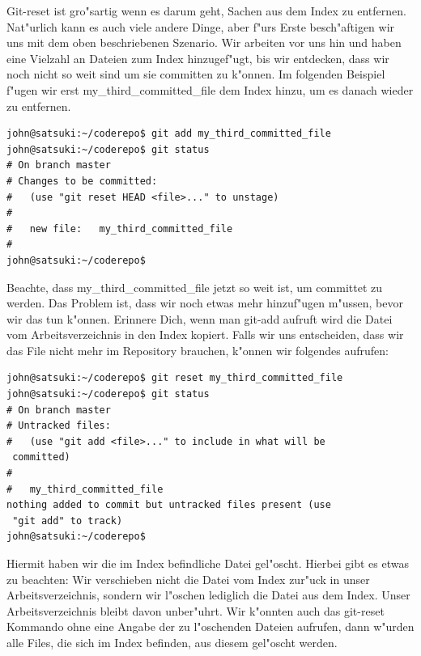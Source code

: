 Git-reset ist gro"sartig wenn es darum geht, Sachen aus dem Index zu entfernen. Nat"urlich kann es auch viele andere Dinge, aber f"urs Erste besch"aftigen wir uns mit dem oben beschriebenen Szenario. Wir arbeiten vor uns hin und haben eine Vielzahl an Dateien zum Index hinzugef"ugt, bis wir entdecken, dass wir noch nicht so weit sind um sie committen zu k"onnen. Im folgenden Beispiel f"ugen wir erst my\_third\_committed\_file dem Index hinzu, um es danach wieder zu entfernen.

\begin{Verbatim}
john@satsuki:~/coderepo$ git add my_third_committed_file
john@satsuki:~/coderepo$ git status
# On branch master
# Changes to be committed:
#   (use "git reset HEAD <file>..." to unstage)
#
#	new file:   my_third_committed_file
#
john@satsuki:~/coderepo$ 
\end{Verbatim} 

Beachte, dass my\_third\_committed\_file jetzt so weit ist, um committet zu werden. Das Problem ist, dass wir noch etwas mehr hinzuf"ugen m"ussen, bevor wir das tun k"onnen. Erinnere Dich, wenn man git-add aufruft wird die Datei vom Arbeitsverzeichnis in den Index kopiert. Falls wir uns entscheiden, dass wir das File nicht mehr im Repository brauchen, k"onnen wir folgendes aufrufen:

\begin{Verbatim}
john@satsuki:~/coderepo$ git reset my_third_committed_file
john@satsuki:~/coderepo$ git status
# On branch master
# Untracked files:
#   (use "git add <file>..." to include in what will be 
 committed)
#
#	my_third_committed_file
nothing added to commit but untracked files present (use 
 "git add" to track)
john@satsuki:~/coderepo$ 
\end{Verbatim}

Hiermit haben wir die im Index befindliche Datei gel"oscht. Hierbei gibt es etwas zu beachten: Wir verschieben nicht die Datei vom Index zur"uck in unser Arbeitsverzeichnis, sondern wir l"oschen lediglich die Datei aus dem Index. Unser Arbeitsverzeichnis bleibt davon unber"uhrt. Wir k"onnten auch das git-reset Kommando ohne eine Angabe der zu l"oschenden Dateien aufrufen, dann w"urden alle Files, die sich im Index befinden, aus diesem gel"oscht werden.

